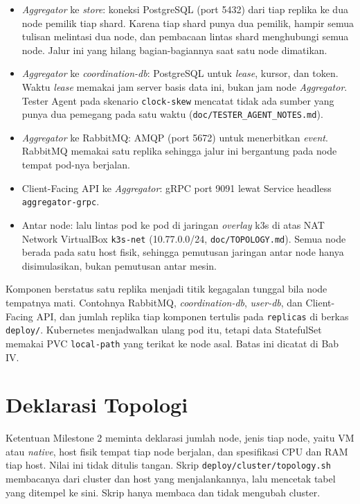 \begin{itemize}
\item \textit{Aggregator} ke \textit{store}: koneksi PostgreSQL (port 5432) dari tiap replika ke dua node pemilik tiap shard. Karena tiap shard punya dua pemilik, hampir semua tulisan melintasi dua node, dan pembacaan lintas shard menghubungi semua node. Jalur ini yang hilang bagian-bagiannya saat satu node dimatikan.
\item \textit{Aggregator} ke \textit{coordination-db}: PostgreSQL untuk \textit{lease}, kursor, dan token. Waktu \textit{lease} memakai jam server basis data ini, bukan jam node \textit{Aggregator}. Tester Agent pada skenario \texttt{clock-skew} mencatat tidak ada sumber yang punya dua pemegang pada satu waktu (\texttt{doc/TESTER\_AGENT\_NOTES.md}).
\item \textit{Aggregator} ke RabbitMQ: AMQP (port 5672) untuk menerbitkan \textit{event}. RabbitMQ memakai satu replika sehingga jalur ini bergantung pada node tempat pod-nya berjalan.
\item Client-Facing API ke \textit{Aggregator}: gRPC port 9091 lewat Service headless \texttt{aggregator-grpc}.
\item Antar node: lalu lintas pod ke pod di jaringan \textit{overlay} k3s di atas NAT Network VirtualBox \texttt{k3s-net} (10.77.0.0/24, \texttt{doc/TOPOLOGY.md}). Semua node berada pada satu host fisik, sehingga pemutusan jaringan antar node hanya disimulasikan, bukan pemutusan antar mesin.
\end{itemize}

Komponen berstatus satu replika menjadi titik kegagalan tunggal bila node tempatnya mati. Contohnya RabbitMQ, \textit{coordination-db}, \textit{user-db}, dan Client-Facing API, dan jumlah replika tiap komponen tertulis pada \texttt{replicas} di berkas \texttt{deploy/}. Kubernetes menjadwalkan ulang pod itu, tetapi data StatefulSet memakai PVC \texttt{local-path} yang terikat ke node asal. Batas ini dicatat di Bab IV.

\section{Deklarasi Topologi}

Ketentuan Milestone 2 meminta deklarasi jumlah node, jenis tiap node, yaitu VM atau \textit{native}, host fisik tempat tiap node berjalan, dan spesifikasi CPU dan RAM tiap host. Nilai ini tidak ditulis tangan. Skrip \texttt{deploy/cluster/topology.sh} membacanya dari cluster dan host yang menjalankannya, lalu mencetak tabel yang ditempel ke sini. Skrip hanya membaca dan tidak mengubah cluster.

